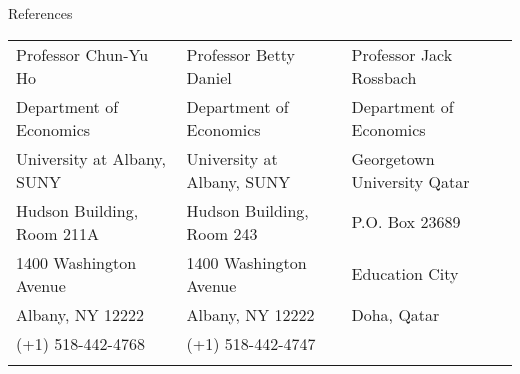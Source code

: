 \documentclass{resume_liang} %
\begin{document}
\begin{rSection}{References}
\begin{tabular}{lll}
	Professor Chun-Yu Ho  & Professor Betty Daniel  & Professor Jack Rossbach \\ 
	Department of Economics &  Department of Economics & Department of Economics \\
	University at Albany, SUNY & University at Albany, SUNY & Georgetown University Qatar \\
	Hudson Building, Room 211A & Hudson Building, Room 243 & P.O. Box 23689 \\
	1400 Washington Avenue & 1400 Washington Avenue & Education City \\
	Albany, NY 12222 & Albany, NY 12222 & Doha, Qatar \\
	(+1) 518-442-4768 & (+1) 518-442-4747 &   \\
	\href{mailto:cho@albany.edu}{\color{blue}{cho@albany.edu}} & \href{mailto:bdaniel@albany.edu}{\color{blue}{bdaniel@albany.edu}} & \href{jack.rossbach@georgetown.edu}{\color{blue}{jack.rossbach@georgetown.edu}}\\
\end{tabular}
\end{rSection}
\bigskip
\end{document}
